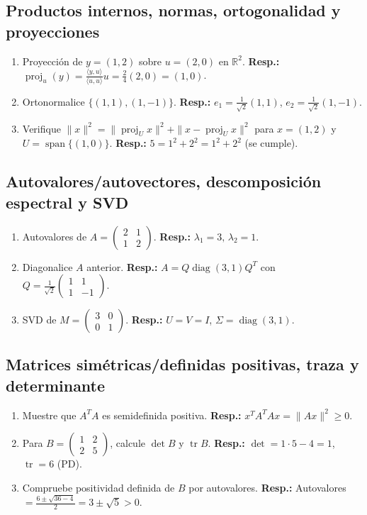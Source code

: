 	\subsection*{Productos internos, normas, ortogonalidad y proyecciones}
	\begin{enumerate}
		\item Proyección de $y=(1,2)$ sobre $u=(2,0)$ en $\mathbb R^2$. \textbf{Resp.:} $\operatorname{proj}_u(y)=\frac{\langle y,u\rangle}{\langle u,u\rangle}u=\tfrac{2}{4}(2,0)=(1,0)$.
		\item Ortonormalice $\{(1,1),(1,-1)\}$. \textbf{Resp.:} $e_1=\tfrac{1}{\sqrt2}(1,1)$, $e_2=\tfrac{1}{\sqrt2}(1,-1)$.
		\item Verifique $\|x\|^2=\|\operatorname{proj}_U x\|^2+\|x-\operatorname{proj}_U x\|^2$ para $x=(1,2)$ y $U=\operatorname{span}\{(1,0)\}$. \textbf{Resp.:} $5=1^2+2^2=1^2+2^2$ (se cumple).
	\end{enumerate}
	
	\subsection*{Autovalores/autovectores, descomposición espectral y SVD}
	\begin{enumerate}
		\item Autovalores de $A=\begin{pmatrix}2&1\\1&2\end{pmatrix}$. \textbf{Resp.:} $\lambda_1=3,\,\lambda_2=1$.
		\item Diagonalice $A$ anterior. \textbf{Resp.:} $A=Q\operatorname{diag}(3,1)Q^T$ con $Q=\tfrac{1}{\sqrt2}\begin{pmatrix}1&1\\1&-1\end{pmatrix}$.
		\item SVD de $M=\begin{pmatrix}3&0\\0&1\end{pmatrix}$. \textbf{Resp.:} $U=V=I$, $\Sigma=\operatorname{diag}(3,1)$.
	\end{enumerate}
	
	\subsection*{Matrices simétricas/definidas positivas, traza y determinante}
	\begin{enumerate}
		\item Muestre que $A^TA$ es semidefinida positiva. \textbf{Resp.:} $x^TA^TAx=\|Ax\|^2\ge0$.
		\item Para $B=\begin{pmatrix}1&2\\2&5\end{pmatrix}$, calcule $\det B$ y $\operatorname{tr} B$. \textbf{Resp.:} $\det=1\cdot5-4=1$, $\operatorname{tr}=6$ (PD).
		\item Compruebe positividad definida de $B$ por autovalores. \textbf{Resp.:} Autovalores $=\tfrac{6\pm\sqrt{36-4}}{2}=3\pm\sqrt{5}>0$.
	\end{enumerate}
	
